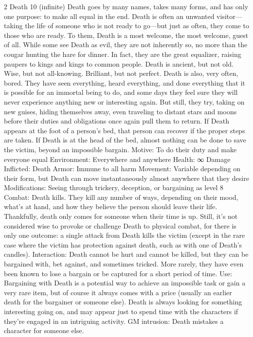 \begin{multicols}{2}
Death 10 (infinite)
Death goes by many names, takes many forms, and has only one purpose: to make all equal in the end. Death is often an unwanted visitor—taking the life of someone who is not ready to go—but just as often, they come to those who are ready. To them, Death is a most welcome, the most welcome, guest of all.
While some see Death as evil, they are not inherently so, no more than the cougar hunting the hare for dinner. In fact, they are the great equalizer, raising paupers to kings and kings to common people.
Death is ancient, but not old. Wise, but not all-knowing. Brilliant, but not perfect. Death is also, very often, bored. They have seen everything, heard everything, and done everything that it is possible for an immortal being to do, and some days they feel sure they will never experience anything new or interesting again. But still, they try, taking on new guises, hiding themselves away, even traveling to distant stars and moons before their duties and obligations once again pull them to return.
	If Death appears at the foot of a person’s bed, that person can recover if the proper steps are taken. If Death is at the head of the bed, almost nothing can be done to save the victim, beyond an impossible bargain.
Motive: To do their duty and make everyone equal
Environment: Everywhere and anywhere
Health: ∞
Damage Inflicted: Death
Armor: Immune to all harm
Movement: Variable depending on their form, but Death can move instantaneously almost
anywhere that they desire
Modifications: Seeing through trickery, deception, or bargaining as level 8
Combat: Death kills. They kill any number of ways, depending on their mood, what’s at
hand, and how they believe the person should leave their life. Thankfully, death only comes for someone when their time is up.
Still, it’s not considered wise to provoke or challenge Death to physical combat, for there is only one outcome: a single attack from Death kills the victim (except in the rare case where the victim has protection against death, such as with one of Death’s candles).
Interaction: Death cannot be hurt and cannot be killed, but they can be bargained with, bet against, and sometimes tricked. More rarely, they have even been known to lose a bargain or be captured for a short period of time.
Use: Bargaining with Death is a potential way to achieve an impossible task or gain a very rare item, but of course it always comes with a price (usually an earlier death for the bargainer or someone else). Death is always looking for something interesting going on, and may appear just to spend time with the characters if they’re engaged in an intriguing activity.
GM intrusion: Death mistakes a character for someone else.


\end{multicols}
